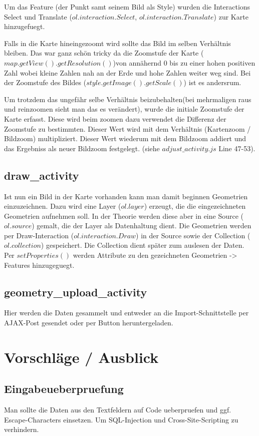 \documentclass[a4paper, 12.5pt]{scrartcl}
\begin{document}
Um das Feature (der Punkt samt seinem Bild als Style) wurden die Interactions Select und Translate ($ol.interaction.Select$, $ol.interaction.Translate$) zur Karte hinzugefuegt.

Falls in die Karte hineingezoomt wird sollte das Bild im selben Verhältnis bleiben. Das war ganz schön tricky da die Zoomstufe der Karte ($map.getView().getResolution()$)von annähernd 0 bis zu einer hohen positiven Zahl wobei kleine Zahlen nah an der Erde und hohe Zahlen weiter weg sind. Bei der Zoomstufe des Bildes ($style.getImage().getScale()$) ist es andersrum.

Um trotzdem das ungefähr selbe Verhältnis beizubehalten(bei mehrmaligen raus und reinzoomen sieht man das es verändert), wurde die initiale Zoomstufe der Karte erfasst. Diese wird beim zoomen dazu verwendet die Differenz der Zoomstufe zu bestimmten. Dieser Wert wird mit dem Verhältnis (Kartenzoom / Bildzoom) multipliziert. Dieser Wert wiederum mit dem Bildzoom addiert und das Ergebniss als neuer Bildzoom festgelegt. (siehe $adjust\_activity.js$ Line 47-53).

\subsection{draw\_activity}
Ist nun ein Bild in der Karte vorhanden kann man damit beginnen Geometrien einzuzeichnen.
Dazu wird eine Layer ($ol.layer$) erzeugt, die die eingezeichneten Geometrien aufnehmen soll. In der Theorie werden diese aber in eine Source ($ol.source$) gemalt, die der Layer als Datenhaltung dient. Die Geometrien werden per Draw-Interaction ($ol.interaction.Draw$) in der Source sowie der Collection ($ol.collection$) gespeichert. Die Collection dient später zum auslesen der Daten. Per $setProperties()$ werden Attribute zu den gezeichneten Geometrien -> Features hinzugeguegt.

\subsection{geometry\_upload\_activity}
Hier werden die Daten gesammelt und entweder an die Import-Schnittstelle per AJAX-Post gesendet oder per Button heruntergeladen.


\section{Vorschläge / Ausblick}
\subsection{Eingabeueberpruefung}
Man sollte die Daten aus den Textfeldern auf Code ueberpruefen und ggf. Escape-Characters einsetzen. Um SQL-Injection und Cross-Site-Scripting zu verhindern.
\end{document}
